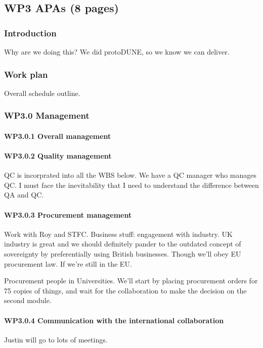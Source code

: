 \subsection{WP3 APAs (8 pages)}

\subsubsection{Introduction}

Why are we doing this?
We did protoDUNE, so we know we can deliver.


\subsubsection{Work plan}

Overall schedule outline.

\subsubsection{WP3.0 Management}
\paragraph{WP3.0.1 Overall management}
\paragraph{WP3.0.2 Quality management}
QC is incorprated into all the WBS below.
We have a QC manager who manages QC.
I must face the inevitability that I need to understand the difference between QA and QC.

\paragraph{WP3.0.3 Procurement management}
Work with Roy and STFC. Business stuff: engagement with industry. UK industry is great and we should definitely pander to the outdated concept of sovereignty by preferentially using British businesses. Though we'll obey EU procurement law. If we're still in the EU.

Procurement people in Universities.
We'll start by placing procurement orders for 75 copies of things, and wait for the collaboration to make the decision on the second module.

\paragraph{WP3.0.4 Communication with the international collaboration}
Justin will go to lots of meetings.

